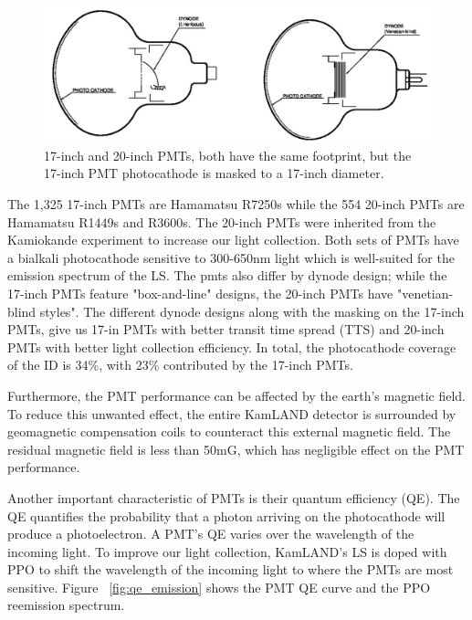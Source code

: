 \begin{figure}[htb]
	\centering
	\includegraphics[scale=0.35]{pmts.png}
	\caption{17-inch and 20-inch PMTs, both have the same footprint, but the 17-inch PMT photocathode is masked to a 17-inch diameter.}
	\label{fig:pmts}
\end{figure}

The 1,325 17-inch PMTs are Hamamatsu R7250s while the 554 20-inch PMTs are Hamamatsu R1449s and R3600s. The 20-inch PMTs were inherited from the Kamiokande experiment to increase our light collection. Both sets of PMTs have a bialkali photocathode sensitive to 300-650nm light which is well-suited for the emission spectrum of the LS. The pmts also differ by dynode design; while the 17-inch PMTs feature "box-and-line" designs, the 20-inch PMTs have "venetian-blind styles". The different dynode designs along with the masking on the 17-inch PMTs, give us 17-in PMTs with better transit time spread (TTS) and 20-inch PMTs with better light collection efficiency. In total, the photocathode coverage of the ID is 34\%, with 23\% contributed by the 17-inch PMTs.

Furthermore, the PMT performance can be affected by the earth's magnetic field. To reduce this unwanted effect, the entire KamLAND detector is surrounded by geomagnetic compensation coils to counteract this external magnetic field. The residual magnetic field is less than 50mG, which has negligible effect on the PMT performance.

Another important characteristic of PMTs is their quantum efficiency (QE). The QE quantifies the probability that a photon arriving on the photocathode will produce a photoelectron. A PMT's QE varies over the wavelength of the incoming light. To improve our light collection, KamLAND's LS is doped with PPO to shift the wavelength of the incoming light to where the PMTs are most sensitive. Figure ~\ref{fig:qe_emission} shows the PMT QE curve and the PPO reemission spectrum.

